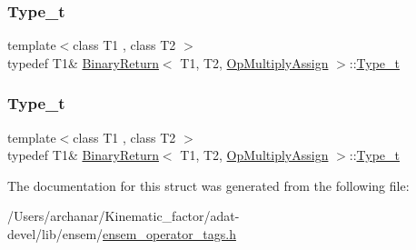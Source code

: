 \mbox{\label{structBinaryReturn_3_01T1_00_01T2_00_01OpMultiplyAssign_01_4_a87fa61c2114e9aa9f0550dc271144d42}} 
\subsubsection{\texorpdfstring{Type\_t}{Type\_t}\hspace{0.1cm}{\footnotesize\ttfamily [2/3]}}
{\footnotesize\ttfamily template$<$class T1 , class T2 $>$ \\
typedef T1\& \mbox{\hyperlink{structBinaryReturn}{Binary\+Return}}$<$ T1, T2, \mbox{\hyperlink{structOpMultiplyAssign}{Op\+Multiply\+Assign}} $>$\+::\mbox{\hyperlink{structBinaryReturn_3_01T1_00_01T2_00_01OpMultiplyAssign_01_4_a87fa61c2114e9aa9f0550dc271144d42}{Type\+\_\+t}}}

\mbox{\label{structBinaryReturn_3_01T1_00_01T2_00_01OpMultiplyAssign_01_4_a87fa61c2114e9aa9f0550dc271144d42}} 
\subsubsection{\texorpdfstring{Type\_t}{Type\_t}\hspace{0.1cm}{\footnotesize\ttfamily [3/3]}}
{\footnotesize\ttfamily template$<$class T1 , class T2 $>$ \\
typedef T1\& \mbox{\hyperlink{structBinaryReturn}{Binary\+Return}}$<$ T1, T2, \mbox{\hyperlink{structOpMultiplyAssign}{Op\+Multiply\+Assign}} $>$\+::\mbox{\hyperlink{structBinaryReturn_3_01T1_00_01T2_00_01OpMultiplyAssign_01_4_a87fa61c2114e9aa9f0550dc271144d42}{Type\+\_\+t}}}



The documentation for this struct was generated from the following file\+:\begin{DoxyCompactItemize}
\item 
/\+Users/archanar/\+Kinematic\+\_\+factor/adat-\/devel/lib/ensem/\mbox{\hyperlink{adat-devel_2lib_2ensem_2ensem__operator__tags_8h}{ensem\+\_\+operator\+\_\+tags.\+h}}\end{DoxyCompactItemize}
